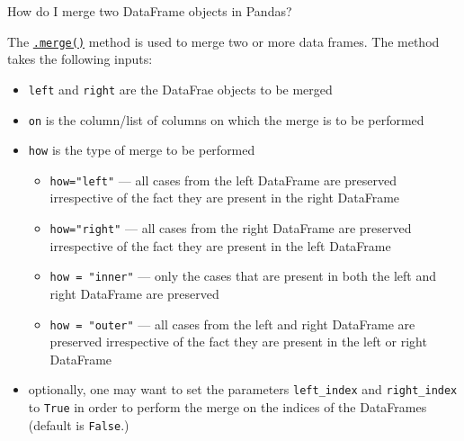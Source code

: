 \documentclass[a4paper,11pt]{book}
\numberwithin{figure}{chapter}
\numberwithin{table}{chapter}
\newcommand{\question}[1]{%
    \begin{tcolorbox}[colback=comp_c!10,colframe=comp_c,sidebyside align=top,width=\linewidth,before skip=1ex]
        #1
    \end{tcolorbox}
    \switchcolumn%
}
\newcommand{\note}[1]{%
    \begin{tcolorbox}[colback=white!0,colframe=white!10,width=\linewidth,before skip=1ex]
        #1
    \end{tcolorbox}
}
\begin{document}
\begin{paracol}{2}
	\question{\raggedright How do I merge two DataFrame objects in Pandas?}
	\note{The \href{https://pandas.pydata.org/docs/reference/api/pandas.merge.html?highlight=merge#pandas.merge}{\texttt{.merge()}} method is used to merge two or more data frames. The method takes the following inputs:
	
	\begin{itemize}
		\item \texttt{left} and \texttt{right} are the DataFrae objects to be merged
		\item \texttt{on} is the column/list of columns on which the merge is to be performed
		\item \texttt{how} is the type of merge to be performed
		\begin{itemize}
			\item \texttt{how="left"} --- all cases from the left DataFrame are preserved irrespective of the fact they are present in the right DataFrame
			\item \texttt{how="right"} --- all cases from the right DataFrame are preserved irrespective of the fact they are present in the left DataFrame
			\item \texttt{how = "inner"} --- only the cases that are present in both the left and right DataFrame are preserved
			\item \texttt{how = "outer"} --- all cases from the left and right DataFrame are preserved irrespective of the fact they are present in the left or right DataFrame
		\end{itemize}
		\item optionally, one may want to set the parameters \texttt{left\_index} and \texttt{right\_index} to \texttt{True} in order to perform the merge on the indices of the DataFrames (default is \texttt{False}.)
	\end{itemize}
	}
\end{paracol}
\end{document}
